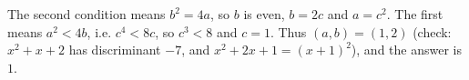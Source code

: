 The second condition means $b^2=4a$, so $b$ is even, $b=2c$ and $a=c^2$. The first means $a^2<4b$, i.e. $c^4<8c$, so $c^3<8$ and $c=1$. Thus $(a,b)=(1,2)$ (check: $x^2+x+2$ has discriminant $-7$, and $x^2+2x+1=(x+1)^2$), and the answer is $\boxed{1}$.
